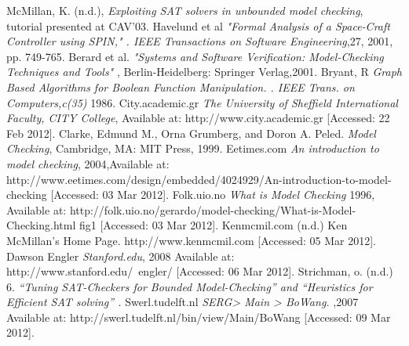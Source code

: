 \documentclass{article}
\begin{document}
\begin{thebibliography}{}
 McMillan, K. (n.d.), \emph{Exploiting SAT solvers in unbounded model checking}, tutorial presented at CAV'03.
 Havelund et al \emph{"Formal Analysis of a Space-Craft Controller using SPIN," . IEEE Transactions on Software Engineering},27, 2001, pp. 749-765.
 Berard et al. \emph{"Systems and Software Verification: Model-Checking Techniques and Tools"} , Berlin-Heidelberg: Springer Verlag,2001.
 Bryant, R \emph{Graph Based Algorithms for Boolean Function Manipulation. . IEEE Trans. on Computers,c(35)} 1986.
 City.academic.gr \emph{The University of Sheffield International Faculty, CITY College}, Available at: http://www.city.academic.gr [Accessed: 22 Feb 2012].
\bibitem{ }
Clarke, Edmund M., Orna Grumberg, and Doron A. Peled. \emph{Model Checking}, Cambridge, MA: MIT Press, 1999.
 Eetimes.com \emph{An introduction to model checking}, 2004,Available at: http://www.eetimes.com/design/embedded/4024929/An-introduction-to-model-checking [Accessed: 03 Mar 2012].
 Folk.uio.no \emph{What is Model Checking} 1996, Available at: http://folk.uio.no/gerardo/model-checking/What-is-Model-Checking.html fig1 [Accessed: 03 Mar 2012].
 Kenmcmil.com (n.d.) Ken McMillan's Home Page. http://www.kenmcmil.com [Accessed: 05 Mar 2012].
 Dawson Engler \emph{Stanford.edu}, 2008 Available at: http://www.stanford.edu/~engler/ [Accessed: 06 Mar 2012].  
 Strichman, o. (n.d.) 6.  \emph{“Tuning SAT-Checkers for Bounded Model-Checking” and “Heuristics for Efficient SAT solving” .}
 Swerl.tudelft.nl \emph{SERG> Main > BoWang.} ,2007 Available at: http://swerl.tudelft.nl/bin/view/Main/BoWang [Accessed: 09 Mar 2012]. 




\end{thebibliography}
\end{document}

